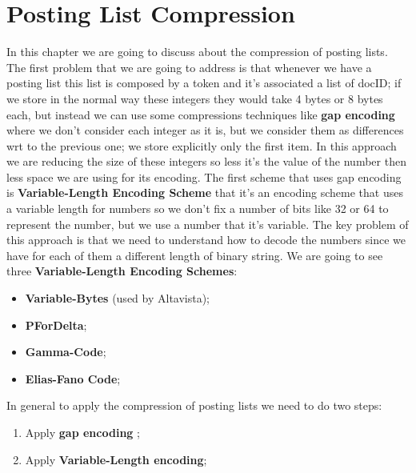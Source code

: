 \chapter{Posting List Compression}
In this chapter we are going to discuss about the compression of posting lists.\newline
The first problem that we are going to address is that whenever we have a posting list this list is composed by a token and it's associated a list of docID; if we store in the normal way these integers they would take 4 bytes or 8 bytes each, but instead we can use some compressions techniques like \textbf{gap encoding} where we don't consider each integer as it is, but we consider them as differences wrt to the previous one; we store explicitly only the first item. In this approach we are reducing the size of these integers so less it's the value of the number then less space we are using for its encoding.\newline
The first scheme that uses gap encoding is \textbf{Variable-Length Encoding Scheme} that it's an encoding scheme that uses a variable length for numbers so we don't fix a number of bits like 32 or 64 to represent the number, but we use a number that it's variable. The key problem of this approach is that we need to understand how to decode the numbers since we have for each of them a different length of binary string.\newline
We are going to see three \textbf{Variable-Length Encoding Schemes}:
\begin{itemize}
    \item \textbf{Variable-Bytes} (used by Altavista);
    \item \textbf{PForDelta};
    \item \textbf{Gamma-Code};
    \item \textbf{Elias-Fano Code};
\end{itemize}
In general to apply the compression of posting lists we need to do two steps:
\begin{enumerate}
    \item Apply \textbf{gap encoding} ;
    \item Apply \textbf{Variable-Length encoding};
\end{enumerate}
